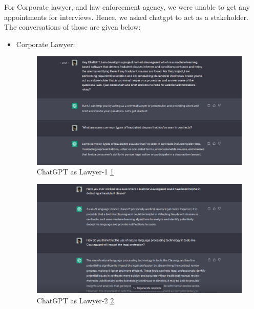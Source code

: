     For Corporate lawyer, and law enforcement agency, we were unable to get any appointments for interviews. Hence, we asked chatgpt \cite{chatgpt} to act as a stakeholder. The conversations of those are given below: 
\begin{itemize}
     
        \item Corporate Lawyer:  \begin{figure}[H]
    \centering
    \includegraphics[scale=0.43]{Figures/gpt lawyer.jpeg}
    \caption{ChatGPT as Lawyer-1 \ref{fig::gpt lawyer}}
    \label{fig::gpt lawyer}
\end{figure}


  
          \begin{figure}[H]
    \centering
    \includegraphics[scale=0.53]{Figures/gpt new lawyer-3.png}
    \caption{ChatGPT\cite{chatgpt} as Lawyer-2 \ref{fig::gpt new lawyer-3}}
    \label{fig::gpt new lawyer-3}
\end{figure}



\end{itemize}
